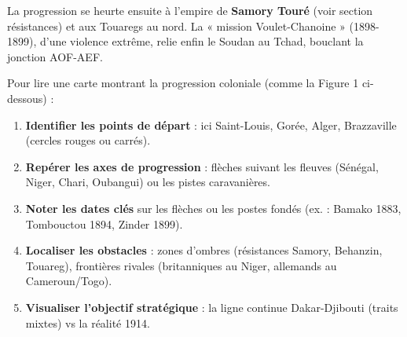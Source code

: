 \documentclass[11pt]{article}
\begin{document}
La progression se heurte ensuite à l'empire de \textbf{Samory Touré} (voir section résistances) et aux Touaregs au nord. La « mission Voulet-Chanoine » (1898-1899), d'une violence extrême, relie enfin le Soudan au Tchad, bouclant la jonction AOF-AEF.

\begin{methode}
Pour lire une carte montrant la progression coloniale (comme la Figure 1 ci-dessous) :
\begin{enumerate}
    \item \textbf{Identifier les points de départ} : ici Saint-Louis, Gorée, Alger, Brazzaville (cercles rouges ou carrés).
    \item \textbf{Repérer les axes de progression} : flèches suivant les fleuves (Sénégal, Niger, Chari, Oubangui) ou les pistes caravanières.
    \item \textbf{Noter les dates clés} sur les flèches ou les postes fondés (ex. : Bamako 1883, Tombouctou 1894, Zinder 1899).
    \item \textbf{Localiser les obstacles} : zones d'ombres (résistances Samory, Behanzin, Touareg), frontières rivales (britanniques au Niger, allemands au Cameroun/Togo).
    \item \textbf{Visualiser l'objectif stratégique} : la ligne continue Dakar-Djibouti (traits mixtes) vs la réalité 1914.
\end{enumerate}
\end{methode}
\end{document}
